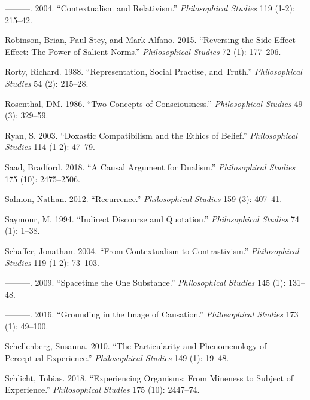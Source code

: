 \documentclass[
  10pt,
  letterpaper,
  DIV=11,
  numbers=noendperiod,
  twoside]{scrartcl}
\newlength{\cslhangindent}
\newenvironment{CSLReferences}[2] %
 {\begin{list}{}{%
  \setlength{\itemindent}{0pt}
  \setlength{\leftmargin}{0pt}
  \setlength{\parsep}{0pt}
  \ifodd #1
   \setlength{\leftmargin}{\cslhangindent}
   \setlength{\itemindent}{-1\cslhangindent}
  \fi
  \setlength{\itemsep}{#2\baselineskip}}}
 {\end{list}}
\begin{document}
\begin{CSLReferences}{1}{0}
---------. 2004. {``Contextualism and Relativism.''} \emph{Philosophical
Studies} 119 (1-2): 215--42.

Robinson, Brian, Paul Stey, and Mark Alfano. 2015. {``Reversing the
Side-Effect Effect: The Power of Salient Norms.''} \emph{Philosophical
Studies} 72 (1): 177--206.

Rorty, Richard. 1988. {``Representation, Social Practise, and Truth.''}
\emph{Philosophical Studies} 54 (2): 215--28.

Rosenthal, DM. 1986. {``Two Concepts of Consciousness.''}
\emph{Philosophical Studies} 49 (3): 329--59.

Ryan, S. 2003. {``Doxastic Compatibilism and the Ethics of Belief.''}
\emph{Philosophical Studies} 114 (1-2): 47--79.

Saad, Bradford. 2018. {``A Causal Argument for Dualism.''}
\emph{Philosophical Studies} 175 (10): 2475--2506.

Salmon, Nathan. 2012. {``Recurrence.''} \emph{Philosophical Studies} 159
(3): 407--41.

Saymour, M. 1994. {``Indirect Discourse and Quotation.''}
\emph{Philosophical Studies} 74 (1): 1--38.

Schaffer, Jonathan. 2004. {``From Contextualism to Contrastivism.''}
\emph{Philosophical Studies} 119 (1-2): 73--103.

---------. 2009. {``Spacetime the One Substance.''} \emph{Philosophical
Studies} 145 (1): 131--48.

---------. 2016. {``Grounding in the Image of Causation.''}
\emph{Philosophical Studies} 173 (1): 49--100.

Schellenberg, Susanna. 2010. {``The Particularity and Phenomenology of
Perceptual Experience.''} \emph{Philosophical Studies} 149 (1): 19--48.

Schlicht, Tobias. 2018. {``Experiencing Organisms: From Mineness to
Subject of Experience.''} \emph{Philosophical Studies} 175 (10):
2447--74.


\end{CSLReferences}
\end{document}
